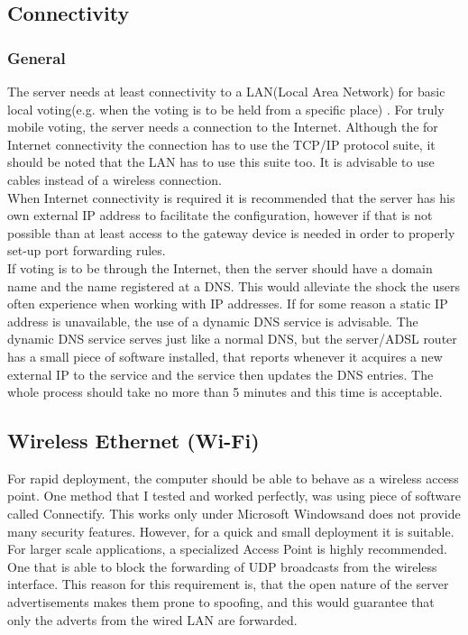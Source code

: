 \documentclass[11pt,twoside,a4paper]{book}
\begin{document}
\subsection{Connectivity}
\subsubsection{General}
The server needs at least connectivity to a LAN(Local Area Network) for basic local voting(e.g. when the voting is to be held from a specific place) . For truly mobile voting, the server needs a connection to the Internet. Although the for Internet connectivity the connection has to use the TCP/IP protocol  suite, it should be noted that the LAN has to use this suite too. It is advisable to use cables instead of a wireless connection. \\
When Internet connectivity is required it is recommended that the server has his own external IP address to facilitate the configuration, however if that is not possible than at least access to the gateway device is needed in order to properly set-up port forwarding rules.
\\
If voting is to be through the Internet, then the server should have a domain name and the name registered at a DNS. This would alleviate the shock the users often experience when working with IP addresses. If for some reason a static IP address is unavailable, the use of a dynamic DNS service is advisable. The dynamic DNS service serves just like a normal DNS, but the server/ADSL router has a small piece of software installed, that reports whenever it acquires a new external IP to the service and the service then updates the DNS entries. The whole process should take no more than 5 minutes and this time is acceptable.
\\
\subsection{Wireless Ethernet (Wi-Fi)}
For rapid deployment, the computer should be able to behave as a wireless access point. One method that I tested and worked perfectly, was using piece of software called Connectify. This works only under Microsoft \textregistered Windows\textregistered and does not provide many security features. However, for a quick and small deployment it is suitable. \\
For larger scale applications, a specialized Access Point is highly recommended. One that is able to block  the forwarding of UDP broadcasts from the wireless interface. This reason for this requirement is, that the open nature of the server advertisements makes them prone to spoofing, and this would guarantee that only the adverts from the wired LAN are forwarded.  
\end{document}
